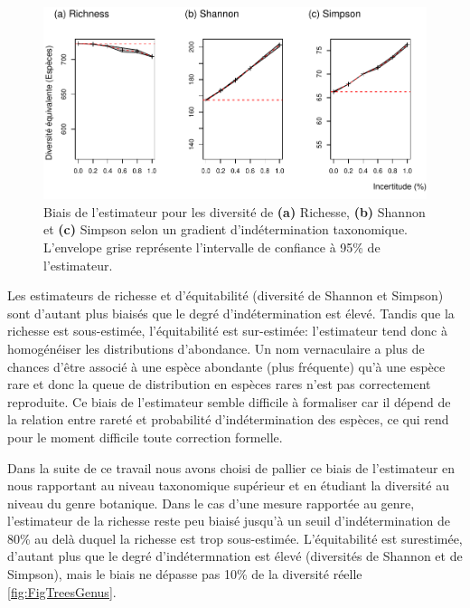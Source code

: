 \documentclass[
  11pt,
  french,
  A4paper,
  extrafontsizes,onecolumn,openright
  ]{memoir}
\begin{document}
\begin{figure}

{\centering \includegraphics[width=1\linewidth]{Manuscript_files/figure-latex/FigTreesSp-1} 

}

\caption{Biais de l'estimateur pour les diversité de \textbf{(a)} Richesse, \textbf{(b)} Shannon et \textbf{(c)} Simpson selon un gradient d'indétermination taxonomique. L'envelope grise représente l'intervalle de confiance à 95\% de l'estimateur.}\label{fig:FigTreesSp}
\end{figure}

Les estimateurs de richesse et d'équitabilité (diversité de Shannon et
Simpson) sont d'autant plus biaisés que le degré d'indétermination est
élevé. Tandis que la richesse est sous-estimée, l'équitabilité est
sur-estimée: l'estimateur tend donc à homogénéiser les distributions
d'abondance. Un nom vernaculaire a plus de chances d'être associé à une
espèce abondante (plus fréquente) qu'à une espèce rare et donc la queue
de distribution en espèces rares n'est pas correctement reproduite. Ce
biais de l'estimateur semble difficile à formaliser car il dépend de la
relation entre rareté et probabilité d'indétermination des espèces, ce
qui rend pour le moment difficile toute correction formelle.

Dans la suite de ce travail nous avons choisi de pallier ce biais de
l'estimateur en nous rapportant au niveau taxonomique supérieur et en
étudiant la diversité au niveau du genre botanique. Dans le cas d'une
mesure rapportée au genre, l'estimateur de la richesse reste peu biaisé
jusqu'à un seuil d'indétermination de 80\% au delà duquel la richesse
est trop sous-estimée. L'équitabilité est surestimée, d'autant plus que
le degré d'indétermnation est élevé (diversités de Shannon et de
Simpson), mais le biais ne dépasse pas 10\% de la diversité réelle
\ref{fig:FigTreesGenus}.
\end{document}
